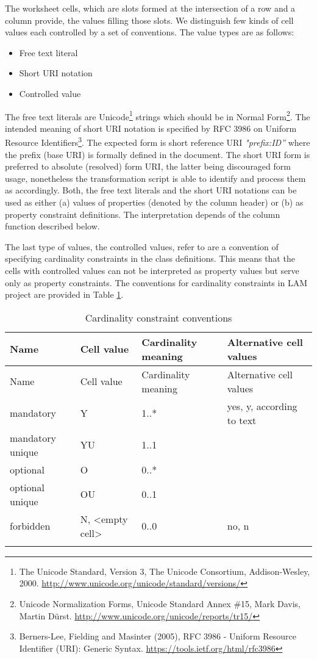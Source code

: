 The worksheet cells, which are slots formed at the intersection of a row
and a column provide, the values filling those slots. We distinguish few
kinds of cell values each controlled by a set of conventions. The value
types are as follows:

\begin{itemize}

\item
  Free text literal
\item
  Short URI notation
\item
  Controlled value
\end{itemize}

The free text literals are
Unicode\footnote{The Unicode Standard,
	Version 3, The Unicode Consortium, Addison-Wesley, 2000.
	\mbox{\url{http://www.unicode.org/unicode/standard/versions/}} } strings which
should be in Normal Form\footnote{Unicode Normalization
	Forms, Unicode Standard Annex \#15, Mark Davis, Martin Dürst.
	\href{http://www.unicode.org/unicode/reports/tr15/\%20}{http://www.unicode.org/unicode/reports/tr15/}}. The intended meaning
of short URI notation is specified by RFC 3986 on Uniform Resource
Identifiers\footnote{Berners-Lee, Fielding
	and Masinter (2005), RFC 3986 - Uniform Resource Identifier (URI):
	Generic Syntax. \url{https://tools.ietf.org/html/rfc3986}}. The
expected form is short reference URI \emph{"prefix:ID'' } where the
prefix (base URI) is formally defined in the document. The short URI
form is preferred to absolute (resolved) form URI, the latter being
discouraged form usage, nonetheless the transformation script is able to
identify and process them as accordingly. Both, the free text literals
and the short URI notations can be used as either (a) values of
properties (denoted by the column header) or (b) as property constraint
definitions. The interpretation depends of the column function described
below.

The last type of values, the controlled values, refer to are a
convention of specifying cardinality constraints in the class
definitions. This means that the cells with controlled values can not be
interpreted as property values but serve only as property constraints.
The conventions for cardinality constraints in LAM project are provided
in Table \ref{tab:cardinality}.

\begin{longtable}[!ht]{@{}p{3.4cm}p{3cm}p{2cm}p{4.5cm}@{}}
\toprule
Name & Cell value & Cardinality meaning & Alternative cell
values\tabularnewline
\midrule
\endfirsthead
\toprule
Name & Cell value & Cardinality meaning & Alternative cell
values\tabularnewline
\midrule
\endhead
mandatory & Y & 1..* & yes, y, according to text\tabularnewline
mandatory unique & YU & 1..1 &\tabularnewline
optional & O & 0..* &\tabularnewline
optional unique & OU & 0..1 &\tabularnewline
forbidden & N, \textless{}empty cell\textgreater{} & 0..0 & no,
n\tabularnewline
\bottomrule
\caption{Cardinality constraint conventions}
\label{tab:cardinality}
\vspace{-10pt}
\end{longtable}

